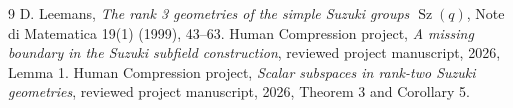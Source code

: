 \documentclass[11pt,a4paper]{article}
\newcommand{\Sz}{\operatorname{Sz}}
\begin{document}
\begin{thebibliography}{9}
 D. Leemans, \emph{The rank 3 geometries of the simple
Suzuki groups $\Sz(q)$}, Note di Matematica 19(1) (1999), 43--63.
 Human Compression project,
\emph{A missing boundary in the Suzuki subfield construction},
reviewed project manuscript, 2026, Lemma 1.
 Human Compression project,
\emph{Scalar subspaces in rank-two Suzuki geometries},
reviewed project manuscript, 2026, Theorem 3 and Corollary 5.
\end{thebibliography}
\end{document}
